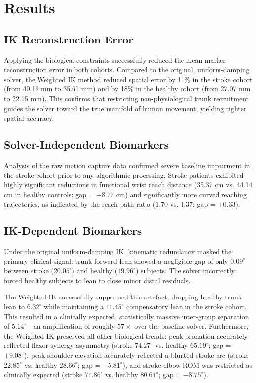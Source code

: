 \documentclass[12pt, a4paper]{article}
\begin{document}
\section{Results}

\subsection{IK Reconstruction Error}
Applying the biological constraints successfully reduced the mean marker reconstruction error in both cohorts. Compared to the original, uniform-damping solver, the Weighted IK method reduced spatial error by 11\% in the stroke cohort (from 40.18 mm to 35.61 mm) and by 18\% in the healthy cohort (from 27.07 mm to 22.15 mm). This confirms that restricting non-physiological trunk recruitment guides the solver toward the true manifold of human movement, yielding tighter spatial accuracy. 

\subsection{Solver-Independent Biomarkers}
Analysis of the raw motion capture data confirmed severe baseline impairment in the stroke cohort prior to any algorithmic processing. Stroke patients exhibited highly significant reductions in functional wrist reach distance (35.37 cm vs. 44.14 cm in healthy controls; gap = $-8.77$ cm) and significantly more curved reaching trajectories, as indicated by the reach-path-ratio (1.70 vs. 1.37; gap = $+0.33$). 

\subsection{IK-Dependent Biomarkers}
Under the original uniform-damping IK, kinematic redundancy masked the primary clinical signal: trunk forward lean showed a negligible gap of only $0.09^{\circ}$ between stroke ($20.05^{\circ}$) and healthy ($19.96^{\circ}$) subjects. The solver incorrectly forced healthy subjects to lean to close minor distal residuals. 

The Weighted IK successfully suppressed this artefact, dropping healthy trunk lean to $6.32^{\circ}$ while maintaining a $11.45^{\circ}$ compensatory lean in the stroke cohort. This resulted in a clinically expected, statistically massive inter-group separation of $5.14^{\circ}$—an amplification of roughly $57\times$ over the baseline solver. Furthermore, the Weighted IK preserved all other biological trends: peak pronation accurately reflected flexor synergy asymmetry (stroke $74.27^{\circ}$ vs. healthy $65.19^{\circ}$; gap = $+9.08^{\circ}$), peak shoulder elevation accurately reflected a blunted stroke arc (stroke $22.85^{\circ}$ vs. healthy $28.66^{\circ}$; gap = $-5.81^{\circ}$), and stroke elbow ROM was restricted as clinically expected (stroke $71.86^{\circ}$ vs. healthy $80.61^{\circ}$; gap = $-8.75^{\circ}$). 
\end{document}
